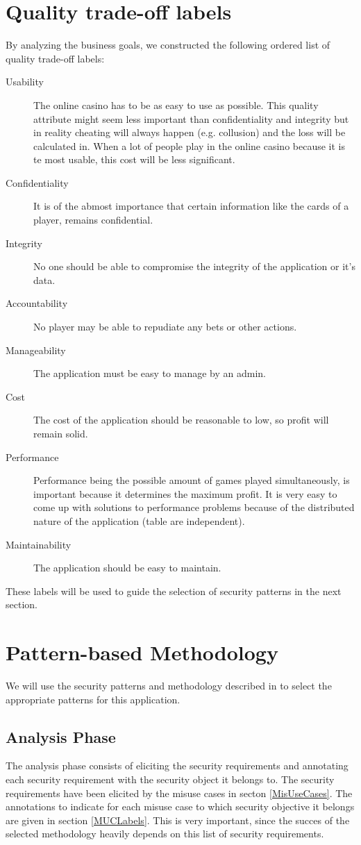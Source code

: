 \documentclass[a4paper,11pt]{report}
\begin{document}
\section{Quality trade-off labels}
\label{labels}
By analyzing the business goals, we constructed the following ordered list of quality trade-off labels:
\begin{description}
\item[Usability] The online casino has to be as easy to use as possible.
This quality attribute might seem less important than confidentiality and
integrity but in reality cheating will always happen (e.g. collusion) and
the loss will be calculated in. When a lot of people play in the online
casino because it is te most usable, this cost will be less significant.
\item[Confidentiality] It is of the abmost importance that certain information like the cards of a player, remains
confidential.
\item[Integrity] No one should be able to compromise the integrity of the application or it's data.
\item[Accountability] No player may be able to repudiate any bets or other actions.
\item[Manageability] The application must be easy to manage by an admin.
\item[Cost] The cost of the application should be reasonable to low, so profit will remain solid.
\item[Performance] Performance being the possible amount of games played simultaneously, is important because it
determines the maximum profit. It is very easy to come up with solutions
to performance problems because of the distributed nature of the
application (table are independent).
\item[Maintainability] The application should be easy to maintain.
\end{description}
These labels will be used to guide the selection of security patterns in the next section.
\section{Pattern-based Methodology}
We will use the security patterns and methodology described in \cite{yskout} to select the appropriate patterns
for this application.

\subsection{Analysis Phase}
The analysis phase consists of eliciting the security requirements and annotating each 
security requirement with the security object it belongs to. The security requirements have been elicited by the misuse cases
in secton \ref{MisUseCases}. The annotations to indicate for each misuse case to which security objective it belongs are given in section \ref{MUCLabels}. This is very important, since the succes of the selected methodology heavily depends 
on this list of security requirements.
\end{document}
